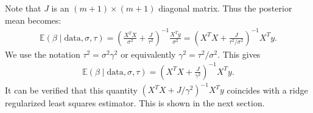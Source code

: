 \documentclass{scrartcl}
\newcommand{\E}{{\mathbb E}}
\begin{document}
Note that $J$ is an $(m+1) \times (m+1)$ diagonal matrix. Thus the
posterior mean becomes: 
\begin{align*}
  \E \left(\beta \mid \text{data}, \sigma, \tau \right) =
  \left(\frac{X^T X}{\sigma^2} + \frac{J}{\tau^2} \right)^{-1}
  \frac{X^T 
  y}{\sigma^2} = \left(X^T X + \frac{J}{\tau^2/\sigma^2} \right)^{-1}
  X^T y. 
\end{align*}
We use the notation $\tau^2 = \sigma^2 \gamma^2$ or equivalently
$\gamma^2 = \tau^2/\sigma^2$. This gives
\begin{align}\label{pm_norm}
  \E \left(\beta \mid \text{data}, \sigma, \tau \right) = \left(X^T X
  + \frac{J}{\gamma^2} \right)^{-1} 
  X^T y.  
\end{align}
It can be verified that this quantity $(X^TX + J/\gamma^2)^{-1} X^T y$
coincides with a ridge regularized least squares estimator. This is
shown in the next section.
\end{document}
